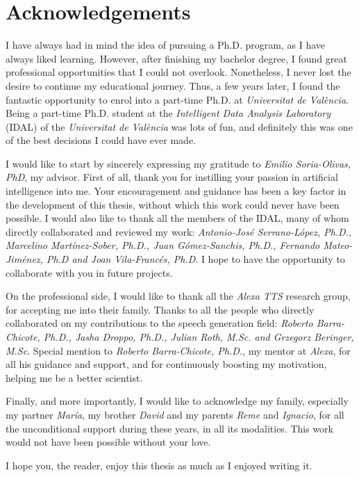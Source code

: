 \chapter*{Acknowledgements}

I have always had in mind the idea of pursuing a Ph.D. program, as I have always liked learning. However, after finishing my bachelor degree, I found great professional opportunities that I could not overlook. Nonetheless, I never lost the desire to continue my educational journey.  Thus, a  few years later, I found the fantastic opportunity to enrol into a part-time Ph.D. at \textit{Universitat de València}. Being a part-time Ph.D. student at the \textit{Intelligent Data Analysis Laboratory} (IDAL) of the \textit{Universitat de València} was lots of fun, and definitely this was one of the best decisions I could have ever made.  

I would like to start by sincerely expressing my gratitude to \textit{Emilio Soria-Olivas, PhD}, my advisor. First of all, thank you for instilling your passion in artificial intelligence into me. Your encouragement and guidance has been a key factor in the development of this thesis, without which this work could never have been possible. I would also like to thank all the members of the IDAL, many of whom directly collaborated and reviewed my work: \textit{Antonio-José Serrano-López, Ph.D., Marcelino  Martínez-Sober, Ph.D., Juan Gómez-Sanchis, Ph.D., Fernando Mateo-Jiménez, Ph.D and Joan Vila-Francés, Ph.D}. I hope to have the opportunity to collaborate with you in future projects.

On the professional side, I would like to thank all the \textit{Alexa TTS} research group, for accepting me into their family. Thanks to all the people who directly collaborated on my contributions to the speech generation field: \textit{Roberto Barra-Chicote, Ph.D., Jasha Droppo, Ph.D., Julian Roth, M.Sc. and Grzegorz Beringer, M.Sc}. Special mention to \textit{Roberto Barra-Chicote, Ph.D.}, my mentor at \textit{Alexa}, for all his guidance and support, and for continuously boosting my motivation, helping me be a better scientist.

Finally, and more importantly, I would like to acknowledge my family, especially my partner \textit{María}, my brother \textit{David} and my parents \textit{Reme} and \textit{Ignacio}, for all the unconditional support during these years, in all its modalities. This work would not have been possible without your love.

I hope you, the reader, enjoy this thesis as much as I enjoyed writing it. 
\clearpage
